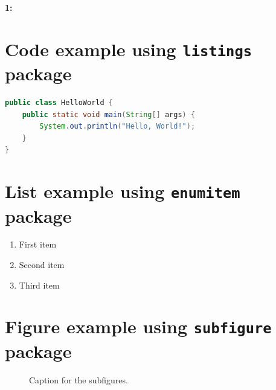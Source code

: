 \documentclass[]{article}
\begin{document}
\noindent\textbf{1:}

\section{Code example using \texttt{listings} package}

\begin{lstlisting}[language=Java]
public class HelloWorld {
    public static void main(String[] args) {
        System.out.println("Hello, World!");
    }
}
\end{lstlisting}

\section{List example using \texttt{enumitem} package}

\begin{enumerate}[label=\roman*.]
    \item First item
    \item Second item
    \item Third item
\end{enumerate}

\section{Figure example using \texttt{subfigure} package}

\begin{figure}[!ht]
    \centering
    \caption{Caption for the subfigures.}
\end{figure}
\end{document}
